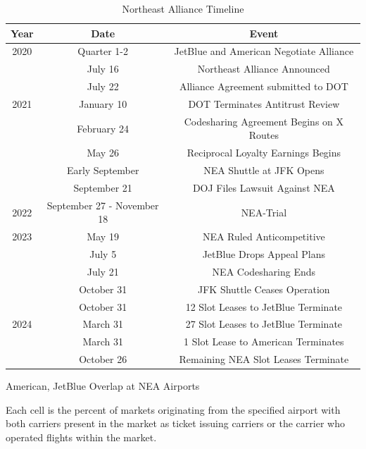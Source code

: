 \documentclass{article}
\begin{document}
\begin{appendices}
			\begin{table}[h]
		\caption{Northeast Alliance Timeline}
		\label{tab:NEA_Timeline}
		\begin{center}
			\begin{tabular}{ccc}
				\hline
				Year & Date & Event \\
				\hline
				2020 & Quarter 1-2 & JetBlue and American Negotiate Alliance \\ 
				& July 16 & Northeast Alliance Announced \\
				& July 22 & Alliance Agreement submitted to DOT \\
				\hline 
				2021 & January 10 & DOT Terminates Antitrust Review \\
				& February 24 & Codesharing Agreement Begins on {X} Routes \\
				& May 26 & Reciprocal Loyalty Earnings Begins \\
				& Early September & NEA Shuttle at JFK Opens \\
				& September 21 & DOJ Files Lawsuit Against NEA \\  
				\hline
				2022 & September 27 - November 18 & NEA-Trial \\
				\hline 
				2023 & May 19 & NEA Ruled Anticompetitive \\
				& July 5 & JetBlue Drops Appeal Plans \\
				& July 21 & NEA Codesharing Ends \\
				& October 31 & JFK Shuttle Ceases Operation\\
				& October 31 & 12 Slot Leases to JetBlue Terminate \\
				\hline 
				2024 &  March 31  & 27 Slot Leases to JetBlue Terminate \\ 
				& March 31 & 1 Slot Lease to American Terminates \\
				& October 26 & Remaining NEA Slot Leases Terminate				 \end{tabular}
		\end{center}
	\end{table}
	
	
	\begin{table}[h]
		\caption{American, JetBlue Overlap at NEA Airports}
		\label{tab:NEA_Airport_Prescence}
		
		\footnotesize{Each cell is the percent of markets originating from the specified airport with both carriers present in the market as ticket issuing carriers or the carrier who operated flights within the market.}
	\end{table}
	

\end{appendices}
\end{document}
